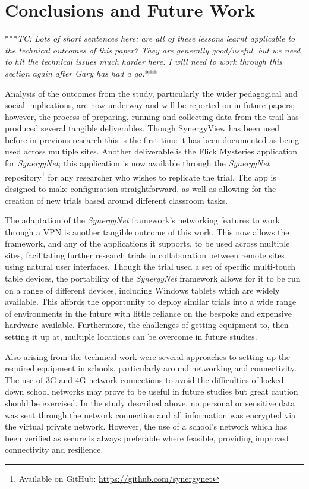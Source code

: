 \documentclass[twocolumn]{svjour3}          %
\begin{document}
\section{Conclusions and Future Work}

***{\emph{TC: Lots of short sentences here; are all of these lessons learnt applicable to the technical outcomes of this paper? They are generally good/useful, but we need to hit the technical issues much harder here. I will need to work through this section again after Gary has had a go.}}***

Analysis of the outcomes from the study, particularly the wider pedagogical and social implications, are now underway and will be reported on in future papers; however, the process of preparing, running and collecting data from the trail has produced several tangible deliverables.
Though SynergyView has been used before in previous research this is the first time it has been documented as being used across multiple sites.
Another deliverable is the Flick Mysteries application for {\emph{SynergyNet}}; this application is now available through the {\emph{SynergyNet}} repository\footnote{Available on GitHub: \url{https://github.com/synergynet}} for any researcher who wishes to replicate the trial.
The app is designed to make configuration straightforward, as well as allowing for the creation of new trials based around different classroom tasks.

The adaptation of the {\emph{SynergyNet}} framework's networking features to work through a VPN is another tangible outcome of this work.
This now allows the framework, and any of the applications it supports, to be used across multiple sites, facilitating further research trials in collaboration between remote sites using natural user interfaces.
Though the trial used a set of specific multi-touch table devices, the portability of the {\emph{SynergyNet}} framework allows for it to be run on a range of different devices, including Windows tablets which are widely available.
This affords the opportunity to deploy similar trials into a wide range of environments in the future with little reliance on the bespoke and expensive hardware available.
Furthermore, the challenges of getting equipment to, then setting it up at, multiple locations can be overcome in future studies.

Also arising from the technical work were several approaches to setting up the required equipment in schools, particularly around networking and connectivity.
The use of 3G and 4G network connections to avoid the difficulties of locked-down school networks may prove to be useful in future studies but great caution should be exercised.
In the study described above, no personal or sensitive data was sent through the network connection and all information was encrypted via the virtual private network.
However, the use of a school's network which has been verified as secure is always preferable where feasible, providing improved connectivity and resilience.
\end{document}
